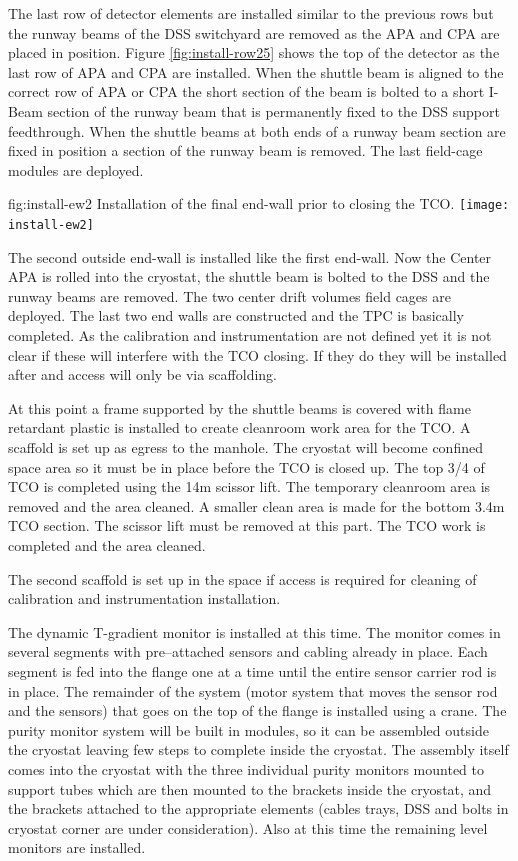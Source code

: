The last row of detector elements are installed similar to the previous rows but the runway beams of the DSS switchyard are removed as the APA and CPA are placed in position. Figure \ref{fig:install-row25} shows the top of the detector as the last row of APA and CPA are installed. When the shuttle beam is aligned to the correct row of APA or CPA the short section of the beam is bolted to a short I-Beam section of the runway beam that is permanently fixed to the DSS support feedthrough. When the shuttle beams at both ends of a runway beam section are fixed in position a section of the runway beam is removed. The last field-cage modules are deployed. 


\begin{dunefigure}{fig:install-ew2}
  {Installation of the final end-wall prior to closing the TCO.}
\texttt{[image: install-ew2]}
\end{dunefigure}

The second outside end-wall is installed like the first end-wall. Now the Center APA is rolled into the cryostat, the shuttle beam is bolted to the DSS and the runway beams are removed. The two center drift volumes field cages are deployed. The last two end walls are constructed and the TPC is basically completed. As the calibration and instrumentation are not defined yet it is not clear if these will interfere with the TCO closing. If they do they will be installed after and access will only be via scaffolding. 

At this point a frame supported by the shuttle beams is covered with flame retardant plastic is installed to create cleanroom work area for the TCO.  A scaffold is set up as egress to the manhole. The cryostat will become confined space area so it must be in place before the TCO is closed up.  The top 3/4 of TCO is completed using the 14m scissor lift. The temporary cleanroom area is removed and the area cleaned. A smaller clean area is made for the bottom 3.4m TCO section.  The scissor lift must be removed at this part. The TCO work is completed and the area cleaned.

The second scaffold is set up in the space if access is required  for cleaning of calibration and instrumentation installation.

The dynamic T-gradient monitor is installed at this time. 
The monitor comes in several segments with pre--attached sensors and cabling already in place. Each segment is fed into the flange one at a time until the entire sensor carrier rod is in place. The remainder of the system (motor system that moves the sensor rod and the sensors) that goes on the top of the flange is installed using a crane. The purity monitor system will be built in modules, so it can be assembled outside the cryostat leaving few steps to complete inside the cryostat. 
The assembly itself comes into the cryostat with the three individual purity monitors mounted to support tubes which are then mounted to the brackets inside the cryostat, and the brackets attached to the appropriate elements (cables trays, DSS and bolts in cryostat corner are under consideration). Also at this time the remaining level monitors are installed.

